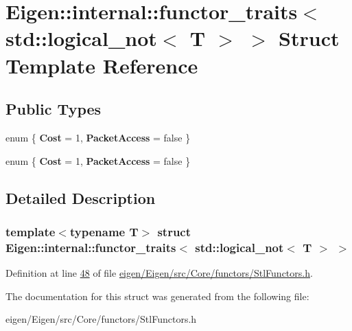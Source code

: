 \hypertarget{struct_eigen_1_1internal_1_1functor__traits_3_01std_1_1logical__not_3_01_t_01_4_01_4}{}\section{Eigen\+:\+:internal\+:\+:functor\+\_\+traits$<$ std\+:\+:logical\+\_\+not$<$ T $>$ $>$ Struct Template Reference}
\label{struct_eigen_1_1internal_1_1functor__traits_3_01std_1_1logical__not_3_01_t_01_4_01_4}
\subsection*{Public Types}
\begin{DoxyCompactItemize}
\item 
\mbox{\label{struct_eigen_1_1internal_1_1functor__traits_3_01std_1_1logical__not_3_01_t_01_4_01_4_ac5cfd891cd3bd59ddf8e11f1dca55dce}} 
enum \{ {\bfseries Cost} = 1, 
{\bfseries Packet\+Access} = false
 \}
\item 
\mbox{\label{struct_eigen_1_1internal_1_1functor__traits_3_01std_1_1logical__not_3_01_t_01_4_01_4_a550cc422e58c269f59d1b33603ccf034}} 
enum \{ {\bfseries Cost} = 1, 
{\bfseries Packet\+Access} = false
 \}
\end{DoxyCompactItemize}


\subsection{Detailed Description}
\subsubsection*{template$<$typename T$>$\newline
struct Eigen\+::internal\+::functor\+\_\+traits$<$ std\+::logical\+\_\+not$<$ T $>$ $>$}



Definition at line \hyperlink{eigen_2_eigen_2src_2_core_2functors_2_stl_functors_8h_source_l00048}{48} of file \hyperlink{eigen_2_eigen_2src_2_core_2functors_2_stl_functors_8h_source}{eigen/\+Eigen/src/\+Core/functors/\+Stl\+Functors.\+h}.



The documentation for this struct was generated from the following file\+:\begin{DoxyCompactItemize}
\item 
eigen/\+Eigen/src/\+Core/functors/\+Stl\+Functors.\+h\end{DoxyCompactItemize}
